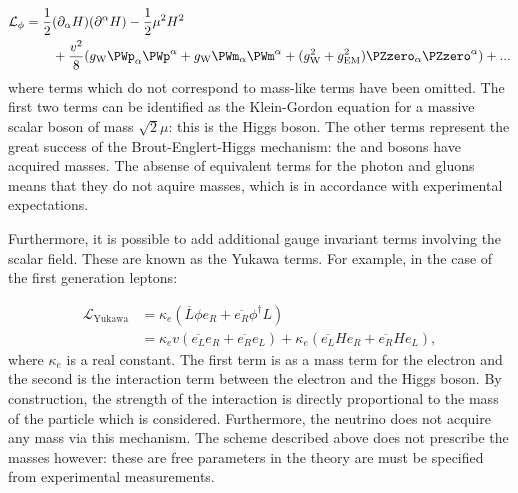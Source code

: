 \begin{equation}
\begin{split}
  \mathcal{L}_{\phi}  =  \frac{1}{2} & (\partial_{\alpha} H) (\partial^{\alpha} H) - \frac{1}{2} \mu^{2} H^2 \\
&  + \frac{v^2}{8}( g_{\textrm{W}} \PWp_{\alpha}\PWp^{\alpha} + g_{\textrm{W}} \PWm_{\alpha}\PWm^{\alpha} + (g^2_{\textrm{W}}+g^2_{\textrm{EM}}) \PZzero_{\alpha}\PZzero^{\alpha}) + ...
\end{split}
\end{equation}
\label{eq:th:higgs_lagrangian}
where terms which do not correspond to mass-like terms have been omitted.
The first two terms can be identified as the Klein-Gordon equation for a massive scalar boson of mass $\sqrt{2}\mu$: this is the Higgs boson. The other terms represent the great success of the Brout-Englert-Higgs mechanism: the \PWpm and \PZzero bosons have acquired masses. The absense of equivalent terms for the photon and gluons means that they do not aquire masses, which is in accordance with experimental expectations.

Furthermore, it is possible to add additional gauge invariant terms involving the scalar field. These are known as the Yukawa terms. For example, in the case of the first generation leptons:

\begin{equation}
\label{eq:th:yukawa_coupling}
\begin{split}
  \mathcal{L}_{\textrm{Yukawa}} &= \kappa_{e} (\overline{L} \phi  e_{R} + \overline{e_{R}} \phi^{\dagger} L )\\
                       &=  \kappa_{e} v (\overline{e_{L}} e_{R} + \overline{e_{R}} e_{L} ) +  \kappa_{e}   (\overline{e_{L}} H e_{R} + \overline{e_{R}} H e_{L} ),
\end{split}
\end{equation}
where $\kappa_{e}$ is a real constant. The first term is as a mass term for the electron and the second is the interaction term between the electron and the Higgs boson. By construction, the strength of the interaction is directly proportional to the mass of the particle which is considered. Furthermore, the neutrino does not acquire any mass via this mechanism. The scheme described above does not prescribe the masses however: these are free parameters in the theory are must be specified from experimental measurements.

